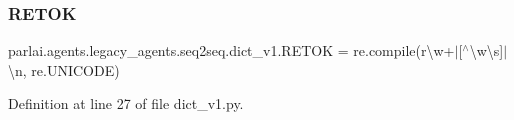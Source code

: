 \subsubsection{\texorpdfstring{R\+E\+T\+OK}{RETOK}}
{\footnotesize\ttfamily parlai.\+agents.\+legacy\+\_\+agents.\+seq2seq.\+dict\+\_\+v1.\+R\+E\+T\+OK = re.\+compile(r\textquotesingle{}\textbackslash{}w+$\vert$\mbox{[}$^\wedge$\textbackslash{}w\textbackslash{}s\mbox{]}$\vert$\textbackslash{}n\textquotesingle{}, re.\+U\+N\+I\+C\+O\+DE)}



Definition at line 27 of file dict\+\_\+v1.\+py.

